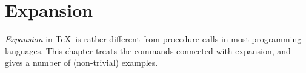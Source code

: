 \documentclass[twoside,letterpaper,openright]{rapport3}
\begin{document}
\chapter{Expansion}\label{expand}

\emph{Expansion} in \TeX\ is rather different from
procedure calls in most programming languages. This chapter treats the
commands connected with expansion, and gives a number of (non-trivial)
examples.
\end{document}
